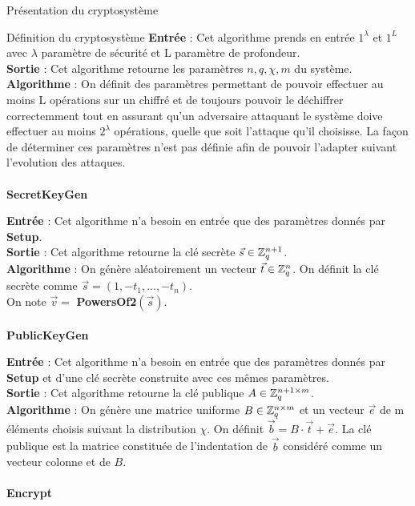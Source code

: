 \begin{section}{Présentation du cryptosystème}
\begin{subsection}{Définition du cryptosystème}
	\textbf{Entrée} : Cet algorithme prends en entrée $1^\lambda$ et $1^L$ avec $\lambda$ paramètre de sécurité et L paramètre de profondeur. \\
	\textbf{Sortie} : Cet algorithme retourne les paramètres $n, q, \chi, m$ du système. \\
	\textbf{Algorithme} : On définit des paramètres permettant de pouvoir effectuer au moins L opérations sur un chiffré et de toujours pouvoir le déchiffrer correctemment tout en assurant qu'un adversaire attaquant le système doive effectuer au moins $2^\lambda$ opérations, quelle que soit l'attaque qu'il choisisse. La façon de déterminer ces paramètres n'est pas définie afin de pouvoir l'adapter suivant l'evolution des attaques. \\
	
	\paragraph{}
	\textbf{SecretKeyGen}
	\flushleft
	
	\textbf{Entrée} : Cet algorithme n'a besoin en entrée que des paramètres donnés par \textbf{Setup}. \\
	\textbf{Sortie} : Cet algorithme retourne la clé secrète $\vec{s} \in \mathbb{Z}_q^{n+1}$. \\
	\textbf{Algorithme} : On génère aléatoirement un vecteur $\vec{t} \in \mathbb{Z}_q^n$. On définit la clé secrète comme $\vec{s} = (1, -t_1, ..., -t_n)$. \\
	On note $\vec{v} = $ \textbf{PowersOf2}$(\vec{s})$.
	
	\paragraph{}
	\textbf{PublicKeyGen}
	\flushleft
	
	\textbf{Entrée} : Cet algorithme n'a besoin en entrée que des paramètres donnés par \textbf{Setup} et d'une clé secrète construite avec ces mêmes paramètres. \\
	\textbf{Sortie} : Cet algorithme retourne la clé publique $A \in \mathbb{Z}_q^{n+1 \times m}$.\\
	\textbf{Algorithme} : On génère une matrice uniforme $B \in \mathbb{Z}_q^{n \times m}$ et un vecteur $\vec{e}$ de m éléments choisis suivant la distribution $\chi$. On définit $\vec{b} = B \cdot \vec{t} + \vec{e}$. La clé publique est la matrice constituée de l'indentation de $\vec{b}$ considéré comme un vecteur colonne et de $B$.
	
	\paragraph{}
	\textbf{Encrypt}
	\flushleft
	

\end{subsection}
\end{section}
